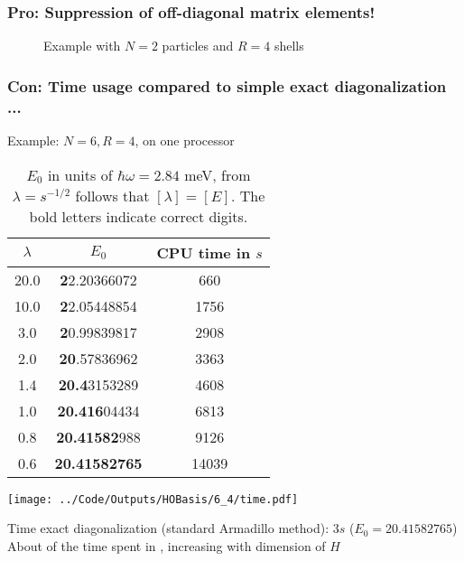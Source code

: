 \documentclass[9pt]{beamer}
\begin{document}
\begin{frame}
\frametitle{Pro: Suppression of off-diagonal matrix elements!}
\begin{figure}
\caption{Example with $N = 2$ particles and $R = 4$ shells}
\end{figure}
\end{frame}

\begin{frame}
\frametitle{Con: Time usage compared to simple exact diagonalization ...}
Example: $N = 6, R = 4$, on one processor
\begin{minipage}{0.6\linewidth}
\begin{table}
\begin{center}
\begin{tabular}{c c c}
\hline\hline
 $\lambda$ & $E_0$ & CPU time in $s$ \\
 \hline
 20.0 & \textbf{2}2.20366072 & 660 \\
 10.0 & \textbf{2}2.05448854 & 1756 \\
 3.0  & \textbf{2}0.99839817 & 2908  \\
 2.0  & \textbf{20}.57836962 & 3363 \\
 1.4  & \textbf{20.4}3153289 & 4608 \\
 1.0 & \textbf{20.416}04434 & 6813 \\
 0.8 & \textbf{20.41582}988 & 9126 \\
 0.6 & \textbf{20.41582765} & 14039 \\
\hline\hline
\end{tabular}
\end{center}
\caption{$E_0$ in units of $\hbar\omega = 2.84$ meV, from $\lambda = s^{-1/2}$ follows that $\left[\lambda\right] 
= \left[ E \right]$. The bold letters indicate correct digits.}
\end{table}
\end{minipage}
\begin{minipage}{0.35\linewidth}
\texttt{[image: ../Code/Outputs/HOBasis/6\_4/time.pdf]}
\vspace{1.5cm}
\end{minipage}

Time exact diagonalization (standard Armadillo method): $3s$  ($E_0 = 20.41582765$)\\
About {\color{red}{90\%}} of the time spent in {\color{red}{derivative function}}, increasing with dimension of $H$
\end{frame}
\end{document}
